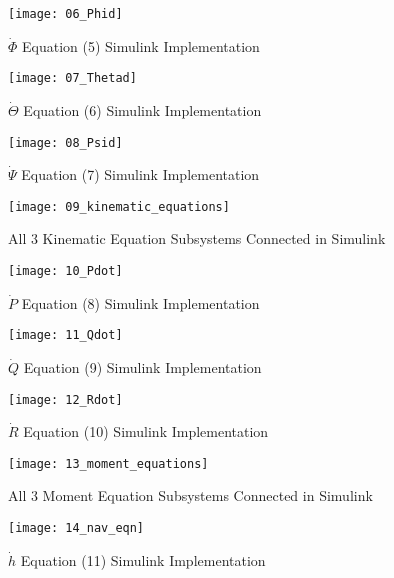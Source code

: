 \begin{figure}[h]
    \centering
    \texttt{[image: 06\_Phid]}
    \caption{$\dot{\Phi}$ Equation (5) Simulink Implementation}
    \label{fig:phid}
\end{figure}

\begin{figure}[h]
    \centering
    \texttt{[image: 07\_Thetad]}
    \caption{$\dot{\Theta}$ Equation (6) Simulink Implementation}
    \label{fig:thetad}
\end{figure}

\begin{figure}[h]
    \centering
    \texttt{[image: 08\_Psid]}
    \caption{$\dot{\Psi}$ Equation (7) Simulink Implementation}
    \label{fig:psid}
\end{figure}

\begin{figure}[h]
    \centering
    \texttt{[image: 09\_kinematic\_equations]}
    \caption{All 3 Kinematic Equation Subsystems Connected in Simulink}
    \label{fig:kine_eqns}
\end{figure}

\begin{figure}[h]
    \centering
    \texttt{[image: 10\_Pdot]}
    \caption{$\dot{P}$ Equation (8) Simulink Implementation}
    \label{fig:Pd}
\end{figure}

\begin{figure}[h]
    \centering
    \texttt{[image: 11\_Qdot]}
    \caption{$\dot{Q}$ Equation (9) Simulink Implementation}
    \label{fig:Qd}
\end{figure}

\begin{figure}[h]
    \centering
    \texttt{[image: 12\_Rdot]}
    \caption{$\dot{R}$ Equation (10) Simulink Implementation}
    \label{fig:Rd}
\end{figure}

\begin{figure}[h]
    \centering
    \texttt{[image: 13\_moment\_equations]}
    \caption{All 3 Moment Equation Subsystems Connected in Simulink}
    \label{fig:mom_eqns}
\end{figure}

\begin{figure}[h]
    \centering
    \texttt{[image: 14\_nav\_eqn]}
    \caption{$\dot{h}$ Equation (11) Simulink Implementation}
    \label{fig:nav_eqn}
\end{figure}

